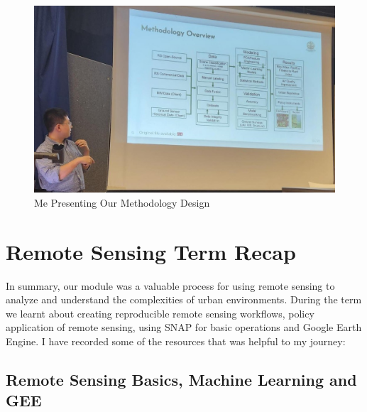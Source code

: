 \documentclass[
  letterpaper,
  DIV=11,
  numbers=noendperiod]{scrreprt}
\begin{document}
\begin{figure}

{\centering \includegraphics[width=6.54167in,height=\textheight]{images/wk10/presentationday.jpg}

}

\caption{Me Presenting Our Methodology Design}

\end{figure}


\hypertarget{remote-sensing-term-recap}{%
\chapter*{Remote Sensing Term Recap}\label{remote-sensing-term-recap}}


In summary, our module was a valuable process for using remote sensing
to analyze and understand the complexities of urban environments. During
the term we learnt about creating reproducible remote sensing workflows,
policy application of remote sensing, using SNAP for basic operations
and Google Earth Engine. I have recorded some of the resources that was
helpful to my journey:

\hypertarget{remote-sensing-basics-machine-learning-and-gee}{%
\section*{Remote Sensing Basics, Machine Learning and
GEE}\label{remote-sensing-basics-machine-learning-and-gee}}
\end{document}
